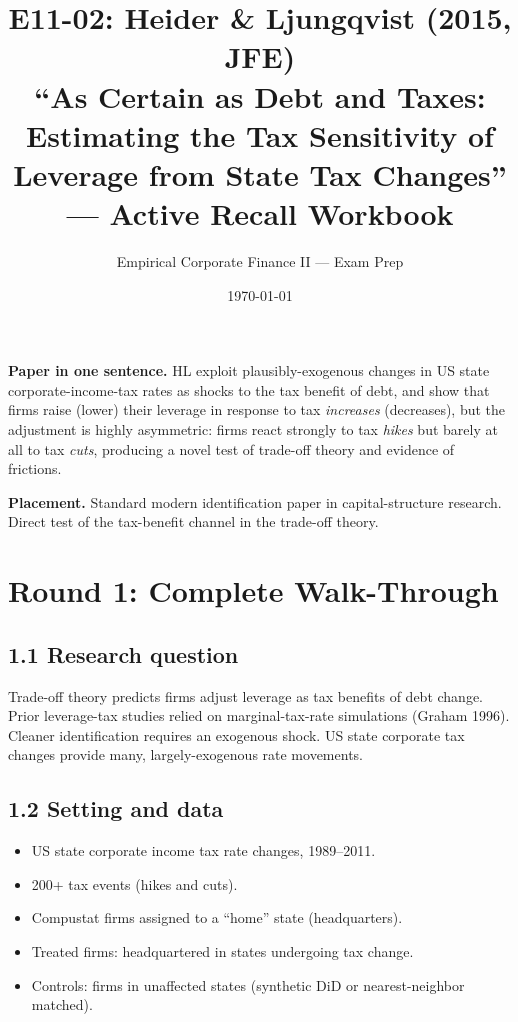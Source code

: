 \documentclass[11pt]{article}
\title{E11-02: Heider \& Ljungqvist (2015, JFE) \\
\large ``As Certain as Debt and Taxes: Estimating the Tax Sensitivity of Leverage from State Tax Changes'' --- Active Recall Workbook}
\author{Empirical Corporate Finance II --- Exam Prep}
\date{\today}
\begin{document}
\maketitle

\begin{keybox}
\textbf{Paper in one sentence.} HL exploit plausibly-exogenous changes in US state corporate-income-tax rates as shocks to the tax benefit of debt, and show that firms raise (lower) their leverage in response to tax \emph{increases} (decreases), but the adjustment is highly asymmetric: firms react strongly to tax \emph{hikes} but barely at all to tax \emph{cuts}, producing a novel test of trade-off theory and evidence of frictions.

\textbf{Placement.} Standard modern identification paper in capital-structure research. Direct test of the tax-benefit channel in the trade-off theory.
\end{keybox}

\section*{Round 1: Complete Walk-Through}

\subsection*{1.1 Research question}
Trade-off theory predicts firms adjust leverage as tax benefits of debt change. Prior leverage-tax studies relied on marginal-tax-rate simulations (Graham 1996). Cleaner identification requires an exogenous shock. US state corporate tax changes provide many, largely-exogenous rate movements.

\subsection*{1.2 Setting and data}
\begin{itemize}
\item US state corporate income tax rate changes, 1989--2011.
\item 200+ tax events (hikes and cuts).
\item Compustat firms assigned to a ``home'' state (headquarters).
\item Treated firms: headquartered in states undergoing tax change.
\item Controls: firms in unaffected states (synthetic DiD or nearest-neighbor matched).
\end{itemize}
\end{document}
